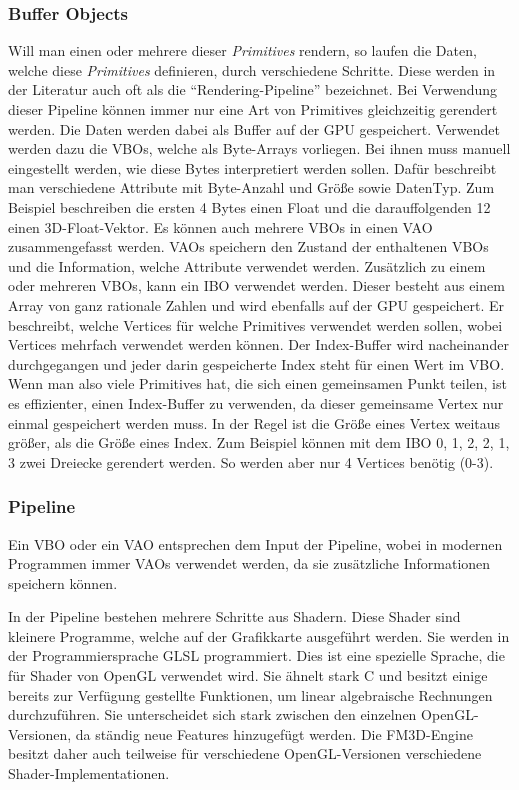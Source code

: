 \subsubsection{Buffer Objects}
Will man einen oder mehrere dieser \textit{Primitives} rendern, so laufen die Daten, welche diese \textit{Primitives} definieren, durch verschiedene Schritte. Diese werden in der Literatur auch oft als die "`Rendering-Pipeline"' bezeichnet. Bei Verwendung dieser Pipeline können immer nur eine Art von Primitives gleichzeitig gerendert werden.
Die Daten werden dabei als Buffer auf der \ac{GPU} gespeichert. Verwendet werden dazu die \acp{VBO}, welche als Byte-Arrays vorliegen. Bei ihnen muss manuell eingestellt werden, wie diese Bytes interpretiert werden sollen. Dafür beschreibt man verschiedene Attribute mit Byte-Anzahl und Größe sowie DatenTyp. Zum Beispiel beschreiben die ersten 4 Bytes einen Float und die darauffolgenden 12 einen 3D-Float-Vektor. Es können auch mehrere \ac{VBO}s in einen \ac{VAO} zusammengefasst werden. \acp{VAO} speichern den Zustand der enthaltenen \acp{VBO} und die Information, welche Attribute verwendet werden. Zusätzlich zu einem oder mehreren \acp{VBO}, kann ein \ac{IBO} verwendet werden. Dieser besteht aus einem Array von ganz rationale Zahlen und wird ebenfalls auf der \ac{GPU} gespeichert. 
Er beschreibt, welche Vertices für welche Primitives verwendet werden sollen, wobei Vertices mehrfach verwendet werden können. 
Der Index-Buffer wird nacheinander durchgegangen und jeder darin gespeicherte Index steht für einen Wert im \ac{VBO}. Wenn man also viele Primitives hat, die sich einen gemeinsamen Punkt teilen, ist es effizienter, einen Index-Buffer zu verwenden, da dieser gemeinsame Vertex nur einmal gespeichert werden muss. In der Regel ist die Größe eines Vertex weitaus größer, als die Größe eines Index. Zum Beispiel können mit dem \ac{IBO} { 0, 1, 2, 2, 1, 3} zwei Dreiecke gerendert werden. So werden aber nur 4 Vertices benötig (0-3)\cite{ThinMatrix}.

\subsubsection{Pipeline \cite{Pipeline}}
Ein \ac{VBO} oder ein \ac{VAO} entsprechen dem Input der Pipeline, wobei in modernen Programmen immer \acp{VAO} verwendet werden, da sie zusätzliche Informationen speichern können.

In der Pipeline bestehen mehrere Schritte aus Shadern. Diese Shader sind kleinere Programme, welche auf der Grafikkarte ausgeführt werden. Sie werden in der Programmiersprache GLSL programmiert. 
Dies ist eine spezielle Sprache, die für Shader von OpenGL verwendet wird. Sie ähnelt stark C und besitzt einige bereits zur Verfügung gestellte Funktionen, um linear algebraische Rechnungen durchzuführen. 
Sie unterscheidet sich stark zwischen den einzelnen OpenGL-Versionen, da ständig neue Features hinzugefügt werden. Die FM3D-Engine besitzt daher auch teilweise für verschiedene OpenGL-Versionen verschiedene Shader-Implementationen.

